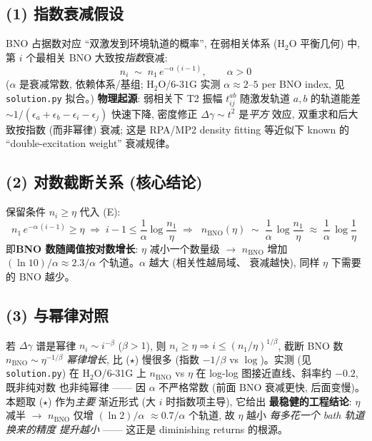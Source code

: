\documentclass[11pt]{article}
\begin{document}
\subsection*{(1) 指数衰减假设}
BNO 占据数对应 ``双激发到环境轨道的概率'', 在弱相关体系 (H$_2$O 平衡几何) 中,
第 $i$ 个最相关 BNO 大致按\emph{指数}衰减:
\[
  \boxed{\;n_i \;\sim\; n_1\,e^{-\alpha\,(i-1)},\qquad \alpha>0\;}
  \tag{E}
\]
($\alpha$ 是衰减常数, 依赖体系/基组; H$_2$O/$6\text{-}31$G 实测
$\alpha\approx 2$--$5$ per BNO index, 见 \texttt{solution.py} 拟合。)
\textbf{物理起源}: 弱相关下 T2 振幅 $t_{ij}^{ab}$ 随激发轨道 $a,b$ 的轨道能差
$\sim 1/(\epsilon_a+\epsilon_b-\epsilon_i-\epsilon_j)$ 快速下降, 密度修正
$\Delta\gamma\sim t^2$ 是\emph{平方} 效应, 双重求和后大致按指数 (而非幂律)
衰减; 这是 RPA/MP2 density fitting 等近似下 known 的 ``double-excitation
weight'' 衰减规律。

\subsection*{(2) 对数截断关系 (核心结论)}
保留条件 $n_i\ge\eta$ 代入 (E):
\[
  n_1\,e^{-\alpha\,(i-1)} \ge \eta
  \;\Longrightarrow\;
  i-1 \le \frac{1}{\alpha}\log\!\frac{n_1}{\eta}
  \;\Longrightarrow\;
  \boxed{\;n_{\text{BNO}}(\eta)\;\sim\;\frac{1}{\alpha}\,\log\!\frac{n_1}{\eta}
  \;\approx\;\frac{1}{\alpha}\,\log\frac{1}{\eta}\;}
  \tag{$\star$}
\]
即\textbf{BNO 数随阈值按对数增长}: $\eta$ 减小一个数量级 $\to$ $n_{\text{BNO}}$
增加 $(\ln 10)/\alpha\approx 2.3/\alpha$ 个轨道。$\alpha$ 越大 (相关性越局域、
衰减越快), 同样 $\eta$ 下需要的 BNO 越少。

\subsection*{(3) 与幂律对照}
若 $\Delta\gamma$ 谱是幂律 $n_i\sim i^{-\beta}$ ($\beta>1$), 则
$n_i\ge\eta\Rightarrow i\le(n_1/\eta)^{1/\beta}$, 截断 BNO 数
$n_{\text{BNO}}\sim\eta^{-1/\beta}$ \emph{幂律增长}, 比 ($\star$) 慢很多
(指数 $-1/\beta$ vs $\log$)。实测 (见 \texttt{solution.py}) 在 H$_2$O/$6$-31G
上 $n_{\text{BNO}}$ vs $\eta$ 在 log-log 图接近直线、斜率约 $-0.2$, 既非纯对数
也非纯幂律 —— 因 $\alpha$ 不严格常数 (前面 BNO 衰减更快, 后面变慢)。
本题取 ($\star$) 作为\emph{主要} 渐近形式 (大 $i$ 时指数项主导), 它给出
\textbf{最稳健的工程结论}: $\eta$ 减半 $\to$ $n_{\text{BNO}}$ 仅增 $(\ln 2)/\alpha$
$\approx 0.7/\alpha$ 个轨道, 故 $\eta$ 越小 \emph{每多花一个 bath 轨道换来的精度
提升越小} —— 这正是 diminishing returns 的根源。

\end{document}

